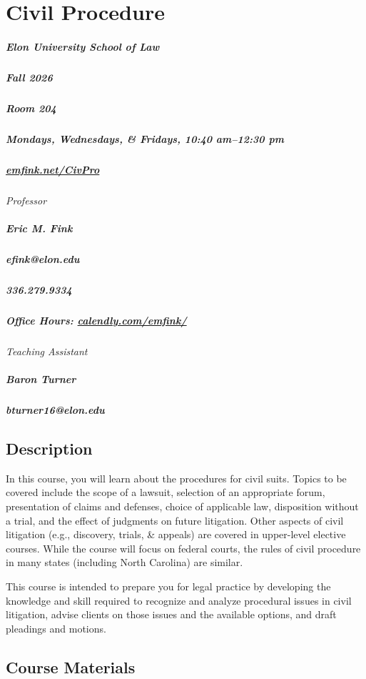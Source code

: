 \documentclass[11pt,letterpaper,twoside]{article}
\begin{document}
\thispagestyle{empty}

\color{OffBlack}

\section{Civil Procedure}

\begin{footnotesize}
\subparagraph{Elon University School of Law}
\subparagraph{Fall 2026}
\subparagraph{Room 204}
\subparagraph{Mondays, Wednesdays, \& Fridays, 10:40 am--12:30 pm}
\subparagraph{\url{emfink.net/CivPro}}
\vspace{1em}

{\itshape{Professor}}
\subparagraph{Eric M. Fink} 
\subparagraph{efink@elon.edu}
\subparagraph{336.279.9334} 
\subparagraph{Office Hours: {\url{calendly.com/emfink/}}}
\vspace{1em}
{\itshape{Teaching Assistant}}
\subparagraph{Baron Turner}
\subparagraph{bturner16@elon.edu}
\end{footnotesize}

\vspace{1em}


\subsection*{Description}\label{description}

In this course, you will learn about the procedures for civil suits.
Topics to be covered include the scope of a lawsuit, selection of an
appropriate forum, presentation of claims and defenses, choice of
applicable law, disposition without a trial, and the effect of judgments
on future litigation. Other aspects of civil litigation (e.g.,
discovery, trials, \& appeals) are covered in upper-level elective
courses. While the course will focus on federal courts, the rules of
civil procedure in many states (including North Carolina) are similar.

This course is intended to prepare you for legal practice by developing
the knowledge and skill required to recognize and analyze procedural
issues in civil litigation, advise clients on those issues and the
available options, and draft pleadings and motions.

\subsection*{Course Materials}\label{course-materials}
\end{document}

